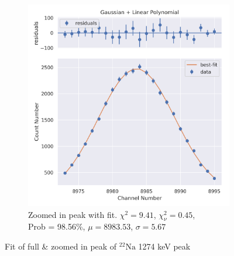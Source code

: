 \documentclass[11pt,a4paper]{article}
\newcommand{\element}[2]{$^{#2}\textrm{#1}$}
\begin{document}
\begin{figure}[H]
\begin{subfigure}{.5\linewidth}
    \includegraphics[width=\linewidth]{./Images/Sodium22/Linear/Linear_2_Zoom.png}
    \caption{Zoomed in peak with fit. $\chi^2 = 9.41$, $\chi^2_\nu = 0.45$, \\ Prob = 98.56\%, $\mu = 8983.53$, $\sigma = 5.67$}
  \end{subfigure}
  \caption{Fit of full \& zoomed in peak of \element{Na}{22} 1274 keV peak}
\end{figure}
\clearpage
\end{document}
